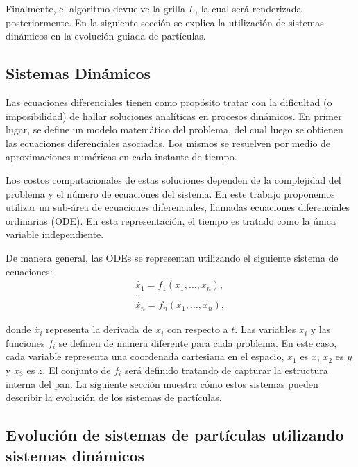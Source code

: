 \documentclass[oneside,a4paper,spanish,links]{amca}
\begin{document}
Finalmente, el algoritmo devuelve la grilla $L$, la cual ser\'a renderizada posteriormente. En la siguiente secci\'on se explica la utilizaci\'on de sistemas din\'amicos en la evoluci\'on guiada de part\'iculas.

\subsection{Sistemas Din\'amicos}

Las ecuaciones diferenciales tienen como prop\'osito tratar con la dificultad (o imposibilidad) de hallar soluciones anal\'iticas en procesos din\'amicos. En primer lugar, se define un modelo matem\'atico del problema, del cual luego se obtienen 
las ecuaciones diferenciales asociadas. Los mismos se resuelven por medio de aproximaciones num\'ericas en cada instante de tiempo.

Los costos computacionales de estas soluciones dependen de la complejidad del problema y el n\'umero de ecuaciones del sistema. En este trabajo proponemos utilizar un sub-\'area de ecuaciones diferenciales, llamadas ecuaciones diferenciales ordinarias (ODE). En esta representaci\'on, el tiempo es tratado como la \'unica variable independiente.


De manera general, las ODEs se representan utilizando el siguiente sistema de ecuaciones:
\begin{equation} \label{eq:simple}  
  \begin{aligned}
    \dot{x_{1}} = f_{1}(x_{1},\ldots,x_{n}),\\
    \ldots\\
    \dot{x_{n}} = f_{n}(x_{1},\ldots,x_{n}),
  \end{aligned}
\end{equation}

\noindent donde $\dot{x_{i}}$ representa la derivada de $x_{i}$ con respecto
a $t$. Las variables $x_{i}$ y las funciones $f_{i}$ se definen de manera diferente para cada problema. En este caso, cada variable representa una coordenada cartesiana en el espacio, $x_{1}$ es $x$, $x_{2}$ es $y$ y $x_{3}$ es $z$. El conjunto de $f_{i}$ ser\'a definido tratando de capturar la estructura interna del pan. La siguiente secci\'on muestra cómo estos sistemas pueden describir la evoluci\'on de los sistemas de part\'iculas.

\subsection{Evoluci\'on de sistemas de part\'iculas utilizando sistemas din\'amicos}
\end{document}
